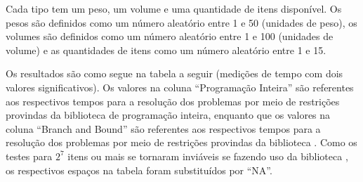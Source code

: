 \documentclass{article}
\begin{document}
Cada tipo tem um peso, um volume e uma quantidade de itens
disponível. Os pesos são definidos como um número aleatório entre 1 e
50 (unidades de peso), os volumes são definidos como um número
aleatório entre 1 e 100 (unidades de volume) e as quantidades de itens
como um número aleatório entre 1 e 15.

Os resultados são como segue na tabela a seguir (medições de tempo com
dois valores significativos). Os valores na coluna ``Programação
Inteira'' são referentes aos respectivos tempos para a resolução dos
problemas por meio de restrições provindas da biblioteca
 de programação inteira, enquanto que os valores na
coluna ``Branch and Bound'' são referentes aos respectivos tempos para
a resolução dos problemas por meio de restrições provindas da
biblioteca . Como os testes para $2^7$
itens ou mais se tornaram inviáveis se fazendo uso da biblioteca
, os respectivos espaços na tabela foram
substituídos por ``NA''.
\end{document}
